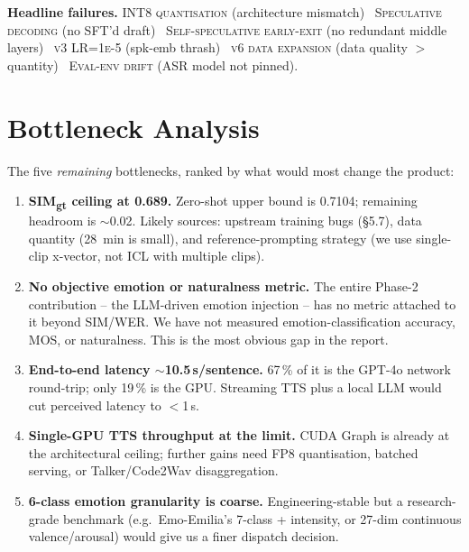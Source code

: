 \documentclass[10pt,a4paper]{article}
\begin{document}
\begin{failbox}\small
\textbf{Headline failures.} \textsc{INT8 quantisation} (architecture
mismatch) \textbullet\ \textsc{Speculative decoding} (no SFT'd draft)
\textbullet\ \textsc{Self-speculative early-exit} (no redundant middle
layers) \textbullet\ \textsc{v3 LR=1e-5} (spk-emb thrash) \textbullet\
\textsc{v6 data expansion} (data quality $>$ quantity) \textbullet\
\textsc{Eval-env drift} (ASR model not pinned).
\end{failbox}

\section{Bottleneck Analysis}

The five \emph{remaining} bottlenecks, ranked by what would most change the
product:

\begin{enumerate}
  \item \textbf{SIM\textsubscript{gt} ceiling at 0.689.} Zero-shot upper
        bound is 0.7104; remaining headroom is $\sim$0.02. Likely sources:
        upstream training bugs (\S5.7), data quantity (28~min is small),
        and reference-prompting strategy (we use single-clip x-vector,
        not ICL with multiple clips).
  \item \textbf{No objective emotion or naturalness metric.} The entire
        Phase-2 contribution -- the LLM-driven emotion injection -- has
        no metric attached to it beyond SIM/WER. We have not measured
        emotion-classification accuracy, MOS, or naturalness. This is the
        most obvious gap in the report.
  \item \textbf{End-to-end latency $\sim$10.5\,s/sentence.} 67\,\% of it
        is the GPT-4o network round-trip; only 19\,\% is the GPU.
        Streaming TTS plus a local LLM would cut perceived latency to
        $<$1\,s.
  \item \textbf{Single-GPU TTS throughput at the limit.} CUDA Graph is
        already at the architectural ceiling; further gains need
        FP8 quantisation, batched serving, or Talker/Code2Wav
        disaggregation.
  \item \textbf{6-class emotion granularity is coarse.} Engineering-stable
        but a research-grade benchmark (e.g.\ Emo-Emilia's 7-class +
        intensity, or 27-dim continuous valence/arousal) would give us
        a finer dispatch decision.
\end{enumerate}
\end{document}
